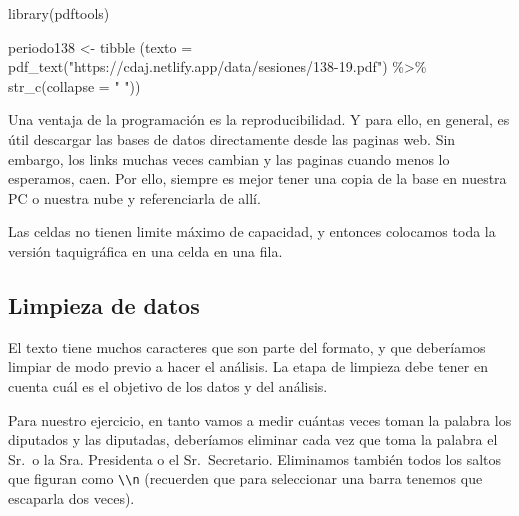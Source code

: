 \documentclass[
]{book}
\newenvironment{Shaded}{\begin{snugshade}}{\end{snugshade}}
\newcommand{\AttributeTok}[1]{\textcolor[rgb]{0.77,0.63,0.00}{#1}}
\newcommand{\FunctionTok}[1]{\textcolor[rgb]{0.00,0.00,0.00}{#1}}
\newcommand{\NormalTok}[1]{#1}
\newcommand{\OtherTok}[1]{\textcolor[rgb]{0.56,0.35,0.01}{#1}}
\newcommand{\SpecialCharTok}[1]{\textcolor[rgb]{0.00,0.00,0.00}{#1}}
\newcommand{\StringTok}[1]{\textcolor[rgb]{0.31,0.60,0.02}{#1}}
\begin{document}
\begin{Shaded}
\begin{Highlighting}[]
\FunctionTok{library}\NormalTok{(pdftools)}

\NormalTok{periodo138 }\OtherTok{\textless{}{-}} \FunctionTok{tibble}\NormalTok{ (}\AttributeTok{texto =} \FunctionTok{pdf\_text}\NormalTok{(}\StringTok{"https://cdaj.netlify.app/data/sesiones/138{-}19.pdf"}\NormalTok{) }\SpecialCharTok{\%\textgreater{}\%} 
                        \FunctionTok{str\_c}\NormalTok{(}\AttributeTok{collapse =} \StringTok{" "}\NormalTok{))}
\end{Highlighting}
\end{Shaded}

Una ventaja de la programación es la reproducibilidad. Y para ello, en general, es útil descargar las bases de datos directamente desde las paginas web. Sin embargo, los links muchas veces cambian y las paginas cuando menos lo esperamos, caen. Por ello, siempre es mejor tener una copia de la base en nuestra PC o nuestra nube y referenciarla de allí.

Las celdas no tienen limite máximo de capacidad, y entonces colocamos toda la versión taquigráfica en una celda en una fila.

\hypertarget{limpieza-de-datos}{%
\subsection{Limpieza de datos}\label{limpieza-de-datos}}

El texto tiene muchos caracteres que son parte del formato, y que deberíamos limpiar de modo previo a hacer el análisis. La etapa de limpieza debe tener en cuenta cuál es el objetivo de los datos y del análisis.

Para nuestro ejercicio, en tanto vamos a medir cuántas veces toman la palabra los diputados y las diputadas, deberíamos eliminar cada vez que toma la palabra el Sr.~o la Sra. Presidenta o el Sr.~Secretario. Eliminamos también todos los saltos que figuran como \texttt{\textbackslash{}\textbackslash{}n} (recuerden que para seleccionar una barra tenemos que escaparla dos veces).
\end{document}
